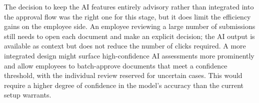 \par The decision to keep the AI features entirely advisory rather than integrated into the approval flow was the right one for this stage, but it does limit the efficiency gains on the employee side. An employee reviewing a large number of submissions still needs to open each document and make an explicit decision; the AI output is available as context but does not reduce the number of clicks required. A more integrated design might surface high-confidence AI assessments more prominently and allow employees to batch-approve documents that meet a confidence threshold, with the individual review reserved for uncertain cases. This would require a higher degree of confidence in the model's accuracy than the current setup warrants.